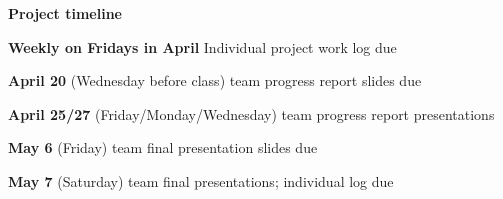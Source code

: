 \documentclass[12pt,letterpaper,answers]{exam}
\begin{document}
\begin{questions}




\end{questions}

\vfill

\noindent\textbf{Project timeline}

\noindent\textbf{Weekly on Fridays in April} Individual project work log due

\noindent\textbf{April 20} (Wednesday before class) team progress report slides due

\noindent\textbf{April 25/27} (Friday/Monday/Wednesday) team progress report presentations

\noindent\textbf{May 6} (Friday) team final presentation slides due

\noindent\textbf{May 7} (Saturday) team final presentations; individual log due
\end{document}
